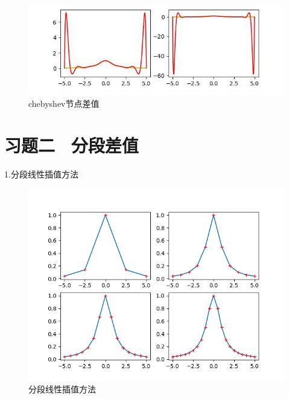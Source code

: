 \begin{figure}[htbp]
    \centering

    {
        \begin{minipage}[b]{.9\linewidth}
            \centering
            \includegraphics[scale=0.6]{pic/newton(2).png}
        \end{minipage}
    }


    \caption{chebyshev节点差值}
\end{figure}
\section{习题二 \ 分段差值}
1.分段线性插值方法
\begin{figure}[htbp]
    \centering

    {
        \begin{minipage}[b]{.9\linewidth}
            \centering
            \includegraphics[scale=0.6]{pic/线性插值.png}
        \end{minipage}
    }


    \caption{分段线性插值方法}
\end{figure}

